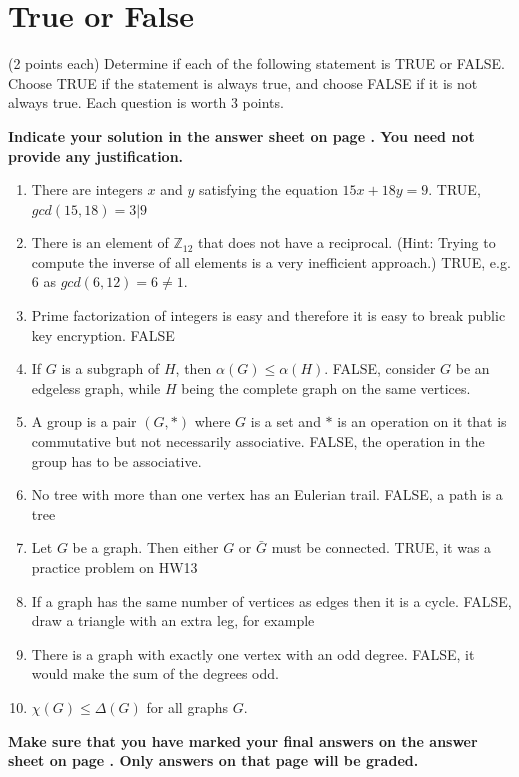 \documentclass[12pt]{article}
\begin{document}
\newpage
\section*{True or False}

(2 points each) Determine if each of the following statement is TRUE or FALSE.\\Choose TRUE if the statement is always true, and choose FALSE if it is not always true. Each question is worth 3 points.

\vspace{0.2cm}

\noindent
\textbf{Indicate your solution in the answer sheet on page \pageref{answersheet}.  You need not provide any justification.}


\begin{enumerate}
\item There are integers $x$ and $y$ satisfying the equation $15x+18y=9$. TRUE, $gcd(15,18)=3|9$
\vspace{0.8cm}
\item There is an element of $\mathbb{Z}_{12}$ that does not have a reciprocal. (Hint: Trying to compute the inverse of all elements is a very inefficient approach.) TRUE, e.g. $6$ as $gcd(6,12)=6\neq 1$.
\vspace{0.8cm}
\item Prime factorization of integers is easy and therefore it is easy to break public key encryption. FALSE
\vspace{0.8cm}
\item If $G$ is a subgraph of $H$, then $\alpha(G)\leq\alpha(H)$. FALSE, consider $G$ be an edgeless graph, while $H$ being the complete graph on the same vertices.
\vspace{0.8cm}
\item A group is a pair $(G,*)$ where $G$ is a set and $*$ is an operation on it that is commutative but not necessarily associative. FALSE, the operation in the group has to be associative.
\vspace{0.8cm}
\item No tree with more than one vertex has an Eulerian trail. FALSE, a path is a tree
\vspace{0.8cm}
\item Let $G$ be a graph. Then either $G$ or $\bar{G}$ must be connected. TRUE, it was a practice problem on HW13
\vspace{0.8cm}
\item If a graph has the same number of vertices as edges then it is a cycle.  FALSE, draw a triangle with an extra leg, for example
\vspace{0.8cm}
\item There is a graph with exactly one vertex with an odd degree. FALSE, it would make the sum of the degrees odd.
\vspace{0.8cm}
\item $\chi(G)\leq\Delta(G)$ for all graphs $G$.
\end{enumerate}
\begin{center}
\textbf{Make sure that you have marked your final answers on the answer sheet on page \pageref{answersheet}. Only answers on that page will be graded.}
\end{center}
\newpage
\end{document}
